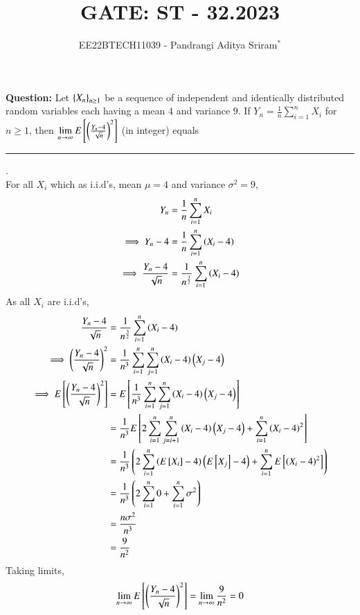 \documentclass[journal,12pt,onecolumn]{IEEEtran}
\theoremstyle{remark}
\begin{document}

\vspace{3cm}

\title{GATE: ST - 32.2023}
\author{EE22BTECH11039 - Pandrangi Aditya Sriram$^{*}$%
}
\maketitle
\bigskip

\renewcommand{\thefigure}{\theenumi}
\renewcommand{\thetable}{\theenumi}


\vspace{3cm}
\textbf{Question:} Let $\left\{X_n\right\}_{n \geq 1}$ be a sequence of independent and identically distributed random variables each having a mean $4$ and variance $9$. If $Y_n = \frac{1}{n} \sum_{i=1}^{n} X_i$ for $n \geq 1$, then $\lim\limits_{n \to \infty} E{}\left[\left(\frac{Y_n - 4}{\sqrt{n}}\right)^2\right]$ (in integer) equals \rule{2cm}{0.1mm}.
\\
\solution
For all $X_i$ which as i.i.d's, mean $\mu = 4$ and variance $\sigma^2 = 9$,
\begin{align}
    Y_n &= \frac{1}{n} \sum_{i=1}^{n} X_i\\
    \implies Y_n - 4 &= \frac{1}{n} \sum_{i=1}^{n} \left(X_i - 4\right)\\
    \implies \frac{Y_n - 4}{\sqrt{n}} &= \frac{1}{n^{\frac{3}{2}}}\sum_{i=1}^{n} \left(X_i - 4\right)\\
\end{align} 
As all $X_i$ are i.i.d's,
\begin{align}
    \frac{Y_n - 4}{\sqrt{n}} &= \frac{1}{n^{\frac{3}{2}}}\sum_{i=1}^{n} \left(X_i - 4\right)\\
    \implies \left(\frac{Y_n - 4}{\sqrt{n}}\right)^2 &= \frac{1}{n^3} \sum_{i=1}^{n} \sum_{j=1}^{n} \left(X_i - 4\right)\left(X_j - 4\right)\\
    \implies E{}\left[\left(\frac{Y_n - 4}{\sqrt{n}}\right)^2\right] &= E{}\left[\frac{1}{n^3} \sum_{i=1}^{n} \sum_{j=1}^{n} \left(X_i - 4\right)\left(X_j - 4\right)\right]\\
    &= \frac{1}{n^3}E{}\left[2\sum_{i=1}^{n}\sum_{j=i+1}^{n} \left(X_i - 4\right)\left(X_j - 4\right) + \sum_{i=1}^n \left(X_i - 4\right)^2\right]\\
    &= \frac{1}{n^3}\left(2\sum_{i=1}^{n} \left(E{}\left[X_i\right] - 4\right)\left(E{}\left[X_j\right] - 4\right)+ \sum_{i=1}^{n} E{}\left[\left(X_i - 4\right)^2\right]\right)\\
    &= \frac{1}{n^3}\left(2\sum_{i=1}^{n} 0 + \sum_{i=1}^{n} \sigma^2\right)\\
    &= \frac{n\sigma^2}{n^3}\\
    &= \frac{9}{n^2}
\end{align}
Taking limits,
\begin{align}
    \lim\limits_{n \to \infty} E{}\left[\left(\frac{Y_n - 4}{\sqrt{n}}\right)^2\right]
    = \lim\limits_{n \to \infty} \frac{9}{n^2} = 0
\end{align}
\end{document}
